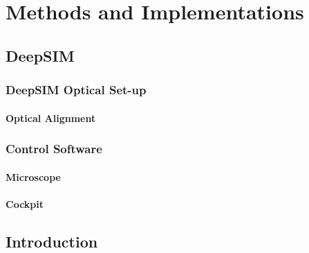 \chapter{Methods and Implementations}

\section{DeepSIM}
\label{sec:DeepSIM}

\subsection{DeepSIM Optical Set-up}
\label{subsec:DeepSIM_optical}

\subsubsection{Optical Alignment}
\label{subsubsec:alignment}

\subsection{Control Software}
\label{subsec:control_software}

\subsubsection{Microscope}
\label{subsubsec:microscope}

\subsubsection{Cockpit}
\label{subsubsec:cockpit}

\section{Introduction}


